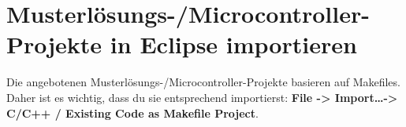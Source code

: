 \section*{Musterlösungs-/Microcontroller-Projekte in Eclipse importieren}

Die angebotenen Musterlösungs-/Microcontroller-Projekte basieren auf Makefiles.
Daher ist es wichtig, dass du sie entsprechend importierst: \textbf{File -> Import\dots -> C/C++ / Existing Code as Makefile Project}.